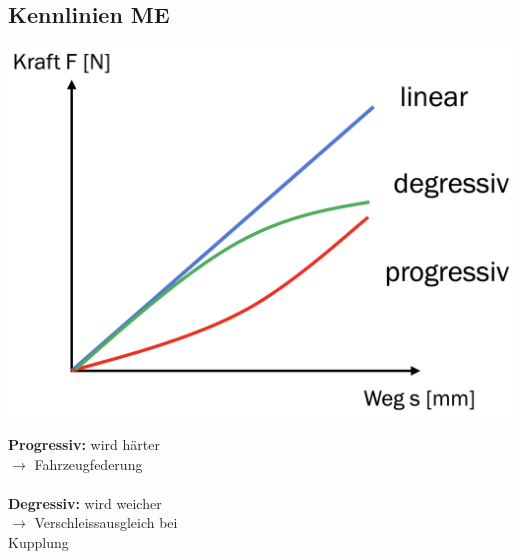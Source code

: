 \subsection{Kennlinien \hfill ME}
\begin{footnotesize}
    \begin{center}
        \begin{minipage}{0.58\linewidth}
            \includegraphics[width = 0.7\linewidth]{src/images/MAEIP_Kennlinien}
        \end{minipage}
        \begin{minipage}{0.4\linewidth}
            \textbf{Progressiv:} wird härter
            \\$\to$ Fahrzeugfederung
            \\~\\
            \textbf{Degressiv:} wird weicher
            \\$\to$ Verschleissausgleich bei\\ Kupplung
        \end{minipage}
    \end{center}
\end{footnotesize}